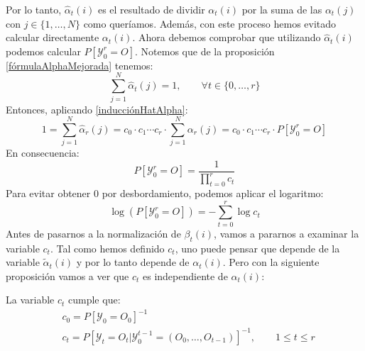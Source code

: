 Por lo tanto, $\hat{\alpha}_t(i)$ es el resultado de dividir $\alpha_t(i)$ por la suma de las $\alpha_t(j)$ con $j\in\{1,\dots,N\}$ como queríamos. Además, con este proceso hemos evitado calcular directamente $\alpha_t(i)$. Ahora debemos comprobar que utilizando $\hat{\alpha}_t(i)$ podemos calcular $P[\mathcal{Y}_0^r=O]$. Notemos que de la proposición \ref{fórmulaAlphaMejorada} tenemos:
\[\sum_{j=1}^N\hat{\alpha}_t(j)=1, \qquad \forall t\in\{0,\dots,r\} \]
Entonces, aplicando \eqref{inducciónHatAlpha}:
\[
    1=\sum_{j=1}^N\hat{\alpha}_r(j)=c_0\cdot c_1\cdots c_r\cdot\sum_{j=1}^N\alpha_r(j) = c_0\cdot c_1\cdots c_r\cdot P[\mathcal{Y}_0^r=O]
\]
En consecuencia:
\[P[\mathcal{Y}_0^r=O]=\dfrac{1}{\displaystyle\prod_{t=0}^r c_t}\]
Para evitar obtener $0$ por desbordamiento, podemos aplicar el logaritmo:
\[\log\left(P[\mathcal{Y}_0^r=O]\right)=-\sum_{t=0}^r\log c_t\]
Antes de pasarnos a la normalización de $\beta_t(i)$, vamos a pararnos a examinar la variable $c_t$. Tal como hemos definido $c_t$, uno puede pensar que depende de la variable $\tilde{\alpha}_t(i)$ y por lo tanto depende de $\alpha_t(i)$. Pero con la siguiente proposición vamos a ver que $c_t$ es independiente de $\alpha_t(i)$:
\begin{proposition}
La variable $c_t$ cumple que:
\[
\begin{aligned}
    &c_0=P[\mathcal{Y}_0=O_0]^{-1} \\
    &c_t=P[\mathcal{Y}_t=O_t|\mathcal{Y}_0^{t-1}=(O_0,\dots,O_{t-1})]^{-1}, \qquad 1\leq t\leq r
\end{aligned}
\]
\end{proposition}
